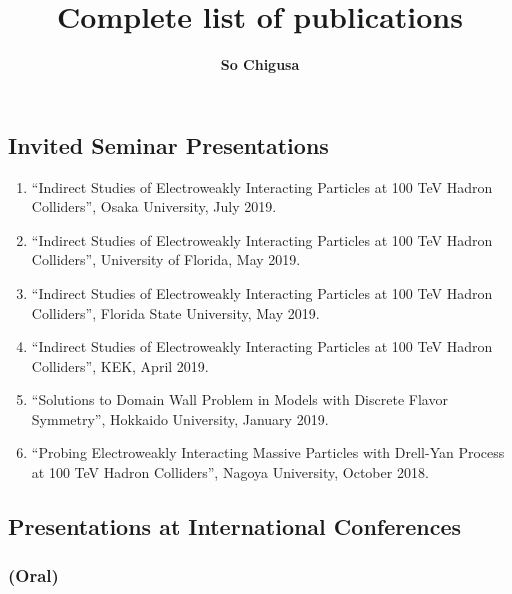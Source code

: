 \documentclass[12pt]{article}
\title{\vspace*{-3cm}Complete list of publications}
\author{\textbf{So Chigusa}}
\date{}
\begin{document}
\maketitle



\subsection*{Invited Seminar Presentations}

\begin{enumerate}
  \item ``Indirect Studies of Electroweakly Interacting Particles at 100 TeV Hadron Colliders'', Osaka University, July 2019.
  \item ``Indirect Studies of Electroweakly Interacting Particles at 100 TeV Hadron Colliders'', University of Florida, May 2019.
  \item ``Indirect Studies of Electroweakly Interacting Particles at 100 TeV Hadron Colliders'', Florida State University, May 2019.
  \item ``Indirect Studies of Electroweakly Interacting Particles at 100 TeV Hadron Colliders'', KEK, April 2019.
  \item ``Solutions to Domain Wall Problem in Models with Discrete Flavor Symmetry'', Hokkaido University, January 2019.
  \item ``Probing Electroweakly Interacting Massive Particles with Drell-Yan Process at 100 TeV Hadron Colliders'', Nagoya University, October 2018.
\end{enumerate}

\subsection*{Presentations at International Conferences}

\subsubsection*{(Oral)}
\end{document}
